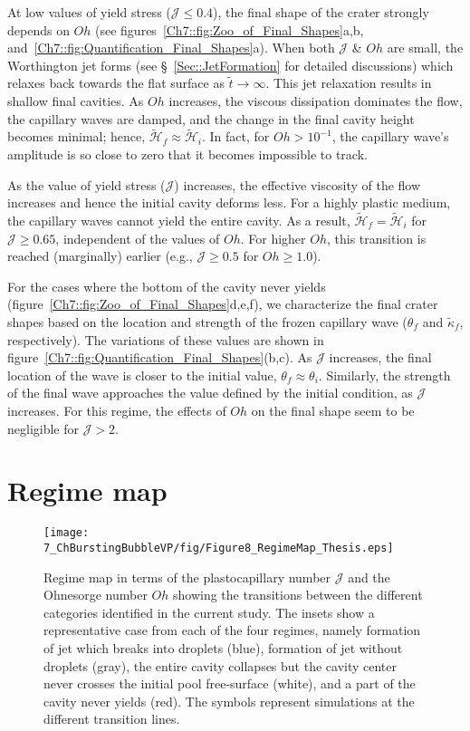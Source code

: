 At low values of yield stress ($\mathcal{J} \le 0.4$), the final shape of the crater strongly depends on $Oh$ (see figures~\ref{Ch7::fig:Zoo_of_Final_Shapes}a,b, and~\ref{Ch7::fig:Quantification_Final_Shapes}a).
When both $\mathcal{J}$ \& $Oh$ are small, the Worthington jet forms (see \S~\ref{Sec::JetFormation} for detailed discussions) which relaxes back towards the flat surface as $\tilde t \to \infty$. This jet relaxation results in shallow final cavities.
As $Oh$ increases, the viscous dissipation dominates the flow, the capillary waves are damped, and the change in the final cavity height becomes minimal; hence, $\tilde{\mathcal{H}}_f \approx \tilde{\mathcal{H}}_i$. In fact, for $Oh > 10^{-1}$, the capillary wave's amplitude is so close to zero that it becomes impossible to track.

As the value of yield stress ($\mathcal{J}$) increases, the effective viscosity of the flow increases and hence the initial cavity deforms less. For a highly plastic medium, the capillary waves cannot yield the entire cavity. As a result, $\tilde{\mathcal{H}}_f = \tilde{\mathcal{H}}_i$ for $\mathcal{J} \ge 0.65$, independent of the values of $Oh$. For higher $Oh$, this transition is reached (marginally) earlier (e.g., $\mathcal{J} \ge 0.5$ for $Oh \ge 1.0$).

For the cases where the bottom of the cavity never yields (figure~\ref{Ch7::fig:Zoo_of_Final_Shapes}d,e,f), we characterize the final crater shapes based on the location and strength of the frozen capillary wave ($\theta_f$ and $\tilde \kappa_f$, respectively). The variations of these values are shown in figure~\ref{Ch7::fig:Quantification_Final_Shapes}(b,c). As $\mathcal{J}$ increases, the final location of the wave is closer to the initial value, $\theta_f \approx \theta_i$. Similarly, the strength of the final wave approaches the value defined by the initial condition, as $\mathcal{J}$ increases. For this regime, the effects of $Oh$ on the final shape seem to be negligible for $\mathcal{J} > 2$. 

\section{Regime map}\label{Sec::RegimeMaps}

\begin{figure}
	\centering
	\texttt{[image: 7\_ChBurstingBubbleVP/fig/Figure8\_RegimeMap\_Thesis.eps]}
	\caption{Regime map in terms of the plastocapillary number $\mathcal{J}$ and the Ohnesorge number $Oh$ showing the transitions between the different categories identified in the current study. The insets show a representative case from each of the four regimes, namely formation of jet which breaks into droplets (blue), formation of jet without droplets (gray), the entire cavity collapses but the cavity center never crosses the initial pool free-surface (white), and a part of the cavity never yields (red). The symbols represent simulations at the different transition lines.}
	\label{Ch7::fig:Regime_Map}
\end{figure}

